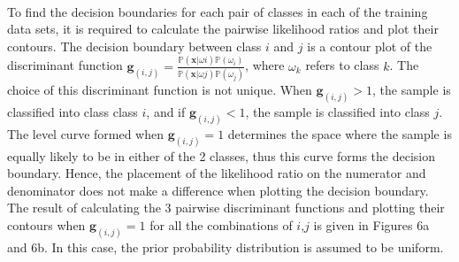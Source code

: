                                                                     \\ \vspace{5mm}

                                                                    To find the decision boundaries for each pair of classes in each of the training data sets, it is required to calculate the pairwise likelihood ratios and plot their contours. The decision boundary between class $i$ and $j$ is a contour plot of the discriminant function $\bm{g}_{(i,j)} = \frac{\mathbb{P}(\bm{x} | \omega{i}) \mathbb{P}( \omega_{i}) }{\mathbb{P}(\bm{x} | \omega{j})\mathbb{P}( \omega_{j}) }$, where
                                                                    $\omega_{k}$ refers to class $k$. The choice of this discriminant function is not unique. When $\bm{g}_{(i,j)} > 1$, the sample is classified into class class $i$, and if $\bm{g}_{(i,j)} < 1$, the sample is classified into class $j$. The level curve formed when $\bm{g}_{(i,j)} = 1$ determines the space where the sample is equally likely to be in either of the 2 classes, thus this curve forms the decision boundary. Hence,
                                                                    the placement of the likelihood ratio on the numerator and denominator does not make a difference when plotting the decision boundary. The result of calculating the 3 pairwise discriminant functions and plotting their contours when $\bm{g}_{(i,j)} = 1$ for all the combinations of $i$,$j$ is given in Figures 6a and 6b. In this case, the prior probability distribution is assumed to be uniform.

